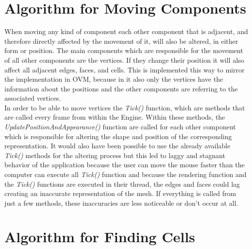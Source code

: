 \documentclass{report}
\begin{document}
	\section{Algorithm for Moving Components}
	\startsection
		When moving any kind of component each other component that is adjacent, and therefore directly affected by the movement of it, will also be altered, in either form or position. The main components which are responsible for the movement of all other components are the vertices. If they change their position it will also affect all adjacent edges, faces, and cells. This is implemented this way to mirror the implementation in OVM, because in it also only the vertices have the information about the positions and the other components are referring to the associated vertices. \\
		In order to be able to move vertices the \textit{Tick()} function, which are methods that are called every frame from within the Engine. Within these methods, the \textit{UpdatePositionAndAppearance()} function are called for each other component which is responsible for altering the shape and position of the corresponding representation. It would also have been possible to use the already available \textit{Tick()} methods for the altering process but this led to laggy and stagnant behavior of the application because the user can move the mouse faster than the computer can execute all \textit{Tick()} function and because the rendering function and the \textit{Tick()} functions are executed in their thread, the edges and faces could lag creating an inaccurate representation of the mesh. If everything is called from just a few methods, these inaccuracies are less noticeable or don't occur at all.
	\closesection
		
	\section{Algorithm for Finding Cells} \label{CellMode}
	\startsection
\end{document}
